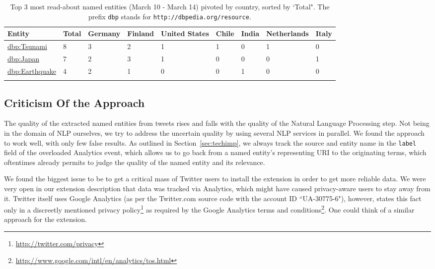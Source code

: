 \documentclass[runningheads,a4paper]{llncs}
\begin{document}
\begin{table}[htb!]
\begin{center}
\begin{tabular}{lllllllll}
\hline
Entity & Total & Germany & Finland & United States & Chile & India & Netherlands & Italy \\
\hline
\url{dbp:Tsunami} & 8 & 3 & 2 & 1 & 1 & 0 & 1 & 0 \\
\url{dbp:Japan} & 7 & 2 & 3 & 1 & 0 & 0 & 0 & 1 \\
\url{dbp:Earthquake} & 4 & 2 & 1 & 0 & 0 & 1 & 0 & 0 \\
\hline \\
\end{tabular}
\end{center}
\caption{Top 3 most read-about named entities (March 10 - March 14) pivoted by country, sorted by `Total". The prefix \texttt{dbp} stands for \texttt{http://dbpedia.org/resource}.}\label{table:pivotbycountry}
\end{table}

\subsection{Criticism Of the Approach}\label{sec:criticism}
The quality of the extracted named entities from tweets rises and falls with the quality of the Natural Language Processing step. Not being in the domain of NLP ourselves, we try to address the uncertain quality by using several NLP services in parallel. We found the approach to work well, with only few false results. As outlined in Section~\ref{sec:techimp}, we always track the source and entity name in the \texttt{label} field of the overloaded Analytics event, which allows us to go back from a named entity's representing URI to the originating terms, which oftentimes already permits to judge the quality of the named entity and its relevance.

We found the biggest issue to be to get a critical mass of Twitter users to install the extension in order to get more reliable data. We were very open in our extension description that data was tracked via Analytics, which might have caused privacy-aware users to stay away from it. Twitter itself uses Google Analytics (as per the Twitter.com source code with the account ID ``UA-30775-6"), however, states this fact only in a discreetly mentioned privacy policy\footnote{\url{http://twitter.com/privacy}} as required by the Google Analytics terms and conditions\footnote{\url{http://www.google.com/intl/en/analytics/tos.html}}. One could think of a similar approach for the extension.
\end{document}
